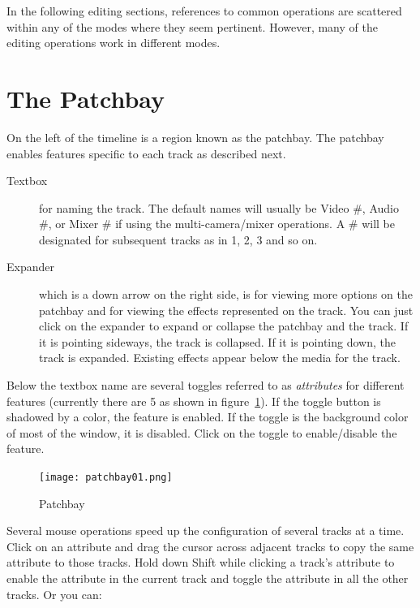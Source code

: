 In the following editing sections, references to common operations
are scattered within any of the modes where they seem pertinent.
However, many of the editing operations work in different modes.


\section{The Patchbay}%
\label{sec:patchbay}

On the left of the timeline is a region known as the patchbay.  The
patchbay enables features specific to each track as described next.


\begin{description}
\item[Textbox] for naming the track.  The default names will usually
  be Video \#, Audio \#, or Mixer \# if using the multi-camera/mixer
  operations.  A \# will be designated for subsequent tracks as in 1,
  2, 3 and so on.
\item[Expander] which is a down arrow on the right side, is for
  viewing more options on the patchbay and for viewing the effects
  represented on the track.  You can just click on the expander to
  expand or collapse the patchbay and the track.  If it is pointing
  sideways, the track is collapsed.  If it is pointing down, the track
  is expanded.  Existing effects appear below the media for the track.
\end{description}

Below the textbox name are several toggles referred to as
\textit{attributes} for different features (currently there are 5 as
shown in figure~\ref{fig:patchbay01}).  If the toggle button is
shadowed by a color, the feature is enabled. If the toggle is the
background color of most of the window, it is disabled. Click on the
toggle to enable/disable the feature.

\begin{figure}
  \centering
  \texttt{[image: patchbay01.png]}
  \caption{Patchbay}
  \label{fig:patchbay01}
\end{figure}

Several mouse operations speed up the configuration of several
tracks at a time. Click on an attribute and drag the cursor across
adjacent tracks to copy the same attribute to those tracks.  Hold
down Shift while clicking a track's attribute to enable the
attribute in the current track and toggle the attribute in all the
other tracks. Or you can:

